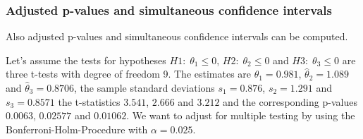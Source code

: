 \documentclass[a4paper, 11pt]{article}
\numberwithin{equation}{section}
\theoremstyle{definition}
\theoremstyle{plain}
\begin{document}
\subsubsection{Adjusted p-values and simultaneous confidence intervals}

Also adjusted p-values and simultaneous confidence intervals can be computed.


Let's assume the tests for hypotheses $H1:\;\theta_1\leq0$,
$H2:\;\theta_2\leq0$ and $H3:\;\theta_3\leq0$ are three t-tests with degree
of freedom 9.  The estimates are
$\hat\theta_1=0.981$,
$\hat\theta_2=1.089$ and
$\hat\theta_3=0.8706$, the sample standard deviations
$s_1=0.876$,
$s_2=1.291$ and
$s_3=0.8571$ the t-statistics
$3.541$, $2.666$ and
$3.212$ and the corresponding p-values $0.0063$, 
$0.02577$ and
$0.01062$.  We want to adjust for multiple testing
by using the Bonferroni-Holm-Procedure with $\alpha=0.025$.
\end{document}
